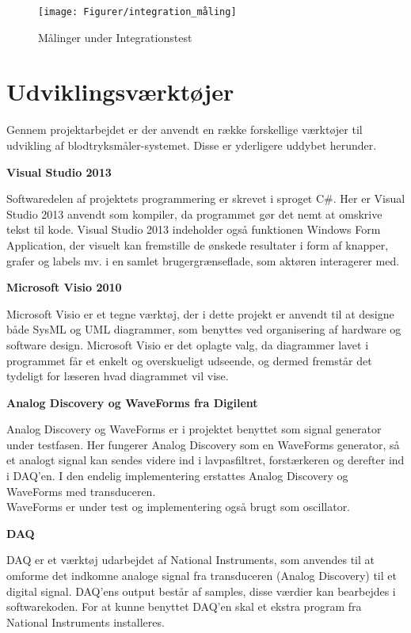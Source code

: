 \begin{figure}[H]
	\centering
	\texttt{[image: Figurer/integration\_måling]}
	\caption{Målinger under Integrationstest}
	\label{fig:Integration_resultat}
\end{figure}

\section{Udviklingsværktøjer}
Gennem projektarbejdet er der anvendt en række forskellige værktøjer til udvikling af blodtryksmåler-systemet. Disse er yderligere uddybet herunder.

\textbf{Visual Studio 2013}

Softwaredelen af projektets programmering er skrevet i sproget C\#. Her er Visual Studio 2013 anvendt som kompiler, da programmet gør det nemt at omskrive tekst til kode. Visual Studio 2013 indeholder også funktionen Windows Form Application, der visuelt kan fremstille de ønskede resultater i form af knapper, grafer og labels mv. i en samlet brugergrænseflade, som aktøren interagerer med. 

\textbf{Microsoft Visio 2010}

Microsoft Visio er et tegne værktøj, der i dette projekt er anvendt til at designe både SysML og UML diagrammer, som benyttes ved organisering af hardware og software design. Microsoft Visio er det oplagte valg, da diagrammer lavet i programmet får et enkelt og overskueligt udseende, og dermed fremstår det tydeligt for læseren hvad diagrammet vil vise.

\textbf{Analog Discovery og WaveForms fra Digilent}

Analog Discovery og WaveForms er i projektet benyttet som signal generator under testfasen. Her fungerer Analog Discovery som en WaveForms generator, så et analogt signal kan sendes videre ind i lavpasfiltret, forstærkeren og derefter ind i DAQ’en. I den endelig implementering erstattes Analog Discovery og WaveForms med transduceren. \\
WaveForms er under test og implementering også brugt som oscillator. 

\textbf{DAQ}

DAQ er et værktøj udarbejdet af National Instruments, som anvendes til at omforme det indkomne analoge signal fra transduceren (Analog Discovery) til et digital signal. DAQ'ens output består af samples, disse værdier kan bearbejdes i softwarekoden. 
For at kunne benyttet DAQ'en skal et ekstra program fra National Instruments installeres. 

